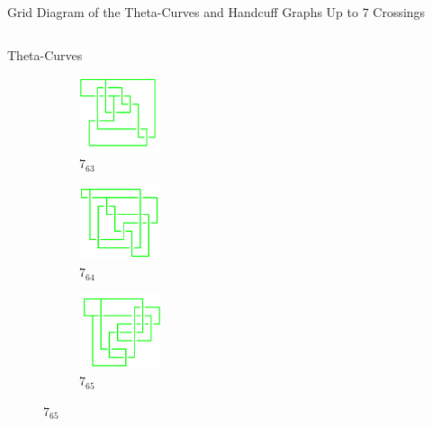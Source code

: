 \documentclass[final]{beamer}
\begin{document}
\begin{frame}[t]
\begin{alertblock}{Grid Diagram of the Theta-Curves and Handcuff Graphs Up to 7 Crossings}
\begin{columns}[t]
\begin{column}{0.6\textwidth}
\begin{alertblock}{Theta-Curves}
\begin{figure}
    \begin{subfigure}{0.075\textwidth}
    \includegraphics[width=2.4cm]{../Midterm_Poster/grid_diagram/theta_7_63.png}
    \caption{$7_{63}$} 
    \end{subfigure}
    \begin{subfigure}{0.075\textwidth}
    \includegraphics[width=2.4cm]{../Midterm_Poster/grid_diagram/theta_7_64.png}
    \caption{$7_{64}$} 
    \end{subfigure}
    \begin{subfigure}{0.075\textwidth}
    \includegraphics[width=2.4cm]{../Midterm_Poster/grid_diagram/theta_7_65.png}
    \caption{$7_{65}$} 
    \end{subfigure}
  \end{figure}



\end{alertblock}
\end{column}
\end{columns}
\end{alertblock}
\end{frame}
\end{document}
